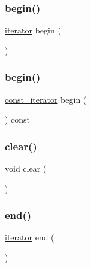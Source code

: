 \subsubsection{\texorpdfstring{begin()}{begin()}\hspace{0.1cm}{\footnotesize\ttfamily [1/2]}}
{\footnotesize\ttfamily \mbox{\hyperlink{classGrid_a438dbfd1a4dbef14e32131afd1bcb42f}{iterator}} begin (\begin{DoxyParamCaption}{ }\end{DoxyParamCaption})\hspace{0.3cm}{\ttfamily [inline]}}

\mbox{\label{classGrid_a29305669b60ca1680752e2fc3592ba99}} 
\subsubsection{\texorpdfstring{begin()}{begin()}\hspace{0.1cm}{\footnotesize\ttfamily [2/2]}}
{\footnotesize\ttfamily \mbox{\hyperlink{classGrid_aab30a5ff3fa2aff5b1f8b875438a3609}{const\+\_\+iterator}} begin (\begin{DoxyParamCaption}{ }\end{DoxyParamCaption}) const\hspace{0.3cm}{\ttfamily [inline]}}

\mbox{\label{classGrid_ac8bb3912a3ce86b15842e79d0b421204}} 
\subsubsection{\texorpdfstring{clear()}{clear()}}
{\footnotesize\ttfamily void clear (\begin{DoxyParamCaption}{ }\end{DoxyParamCaption})}

\mbox{\label{classGrid_acad38d52497a975bfb6f2f6acd76631f}} 
\subsubsection{\texorpdfstring{end()}{end()}\hspace{0.1cm}{\footnotesize\ttfamily [1/2]}}
{\footnotesize\ttfamily \mbox{\hyperlink{classGrid_a438dbfd1a4dbef14e32131afd1bcb42f}{iterator}} end (\begin{DoxyParamCaption}{ }\end{DoxyParamCaption})\hspace{0.3cm}{\ttfamily [inline]}}

